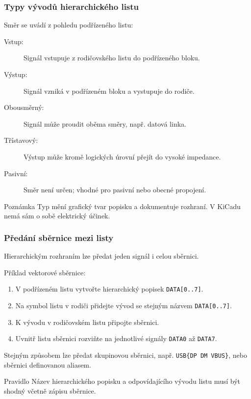 \documentclass{beamer}
\begin{document}
\begin{frame}
	\frametitle{Typy vývodů hierarchického listu}
	Směr se uvádí z pohledu podřízeného listu:
	\begin{description}
		\item[Vstup:] Signál vstupuje z rodičovského listu do podřízeného bloku.
		\item[Výstup:] Signál vzniká v podřízeném bloku a vystupuje do rodiče.
		\item[Obousměrný:] Signál může proudit oběma směry, např. datová linka.
		\item[Třístavový:] Výstup může kromě logických úrovní přejít do vysoké impedance.
		\item[Pasivní:] Směr není určen; vhodné pro pasivní nebo obecné propojení.
	\end{description}

	\vfill
	\begin{block}{Poznámka}
		Typ mění grafický tvar popisku a dokumentuje rozhraní. V KiCadu nemá sám o sobě elektrický účinek.
	\end{block}
\end{frame}

\begin{frame}
	\frametitle{Předání sběrnice mezi listy}
	Hierarchickým rozhraním lze předat jeden signál i celou sběrnici.

	\medskip
	Příklad vektorové sběrnice:
	\begin{enumerate}
		\item V podřízeném listu vytvořte hierarchický popisek \texttt{DATA[0..7]}.
		\item Na symbol listu v rodiči přidejte vývod se stejným názvem \texttt{DATA[0..7]}.
		\item K vývodu v rodičovském listu připojte sběrnici.
		\item Uvnitř listu sběrnici rozviňte na jednotlivé signály \texttt{DATA0} až \texttt{DATA7}.
	\end{enumerate}

	\medskip
	Stejným způsobem lze předat skupinovou sběrnici, např. \texttt{USB\{DP DM VBUS\}}, nebo sběrnici definovanou aliasem.

	\vfill
	\begin{block}{Pravidlo}
		Název hierarchického popisku a odpovídajícího vývodu listu musí být shodný včetně zápisu sběrnice.
	\end{block}
\end{frame}
\end{document}
